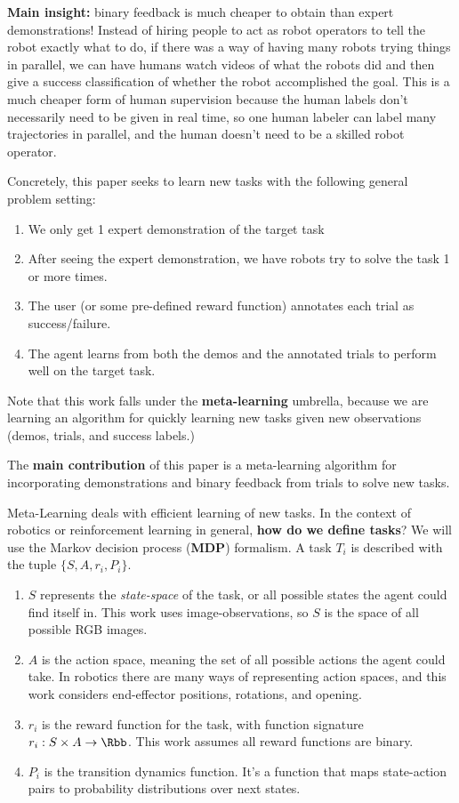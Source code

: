 \documentclass[
  letterpaper,
  DIV=11,
  numbers=noendperiod,
  oneside]{scrreprt}
\theoremstyle{remark}
\begin{document}
\textbf{Main insight:} binary feedback is much cheaper to obtain than
expert demonstrations! Instead of hiring people to act as robot
operators to tell the robot exactly what to do, if there was a way of
having many robots trying things in parallel, we can have humans watch
videos of what the robots did and then give a success classification of
whether the robot accomplished the goal. This is a much cheaper form of
human supervision because the human labels don't necessarily need to be
given in real time, so one human labeler can label many trajectories in
parallel, and the human doesn't need to be a skilled robot operator.

Concretely, this paper seeks to learn new tasks with the following
general problem setting:

\begin{enumerate}
\def\labelenumi{\arabic{enumi}.}
\item
  We only get 1 expert demonstration of the target task
\item
  After seeing the expert demonstration, we have robots try to solve the
  task 1 or more times.
\item
  The user (or some pre-defined reward function) annotates each trial as
  success/failure.
\item
  The agent learns from both the demos and the annotated trials to
  perform well on the target task.
\end{enumerate}

Note that this work falls under the \textbf{meta-learning} umbrella,
because we are learning an algorithm for quickly learning new tasks
given new observations (demos, trials, and success labels.)

The \textbf{main contribution} of this paper is a meta-learning
algorithm for incorporating demonstrations and binary feedback from
trials to solve new tasks.

Meta-Learning deals with efficient learning of new tasks. In the context
of robotics or reinforcement learning in general, \textbf{how do we
define tasks}? We will use the Markov decision process (\textbf{MDP})
formalism. A task \(T_i\) is described with the tuple
\(\{S, A, r_i, P_i\}\).

\begin{enumerate}
\def\labelenumi{\arabic{enumi}.}
\item
  \(S\) represents the \emph{state-space} of the task, or all possible
  states the agent could find itself in. This work uses
  image-observations, so \(S\) is the space of all possible RGB images.
\item
  \(A\) is the action space, meaning the set of all possible actions the
  agent could take. In robotics there are many ways of representing
  action spaces, and this work considers end-effector positions,
  rotations, and opening.
\item
  \(r_i\) is the reward function for the task, with function signature
  \(r_i : S \times A \to \Rbb\). This work assumes all reward functions
  are binary.
\item
  \(P_i\) is the transition dynamics function. It's a function that maps
  state-action pairs to probability distributions over next states.
\end{enumerate}
\end{document}

